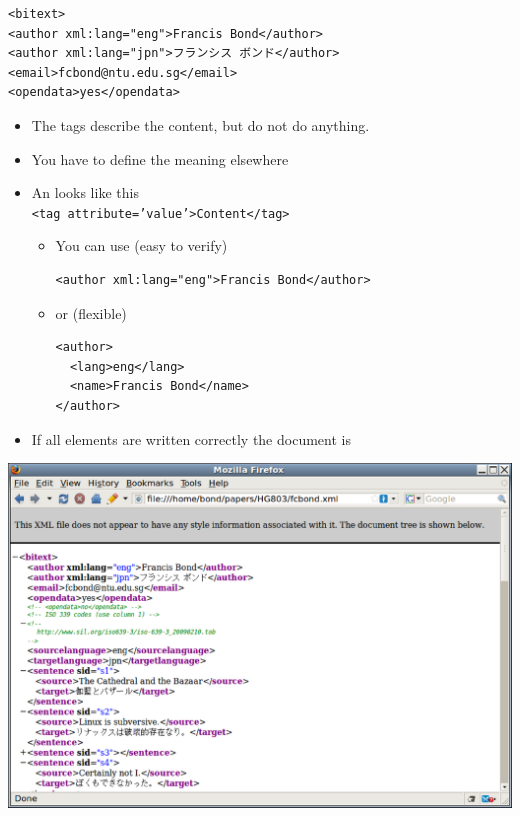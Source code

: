 \documentclass[a4paper,landscape,headrule,footrule,xetex]{foils}
\begin{document}


\begin{verbatim}
<bitext> 
<author xml:lang="eng">Francis Bond</author> 
<author xml:lang="jpn">フランシス ボンド</author>
<email>fcbond@ntu.edu.sg</email> 
<opendata>yes</opendata>
\end{verbatim}

\begin{itemize}
\item The tags describe the content, but do not do anything.
\item You have to define the meaning elsewhere
\end{itemize}


\begin{itemize}
\item An  looks like this
\\ \texttt{<tag attribute='value'>Content</tag>}
  \begin{itemize}
\item You can use  (easy to verify)
\begin{verbatim}
<author xml:lang="eng">Francis Bond</author>
\end{verbatim}
  \item or  (flexible)
\begin{verbatim}
<author>
  <lang>eng</lang>
  <name>Francis Bond</name>
</author>
\end{verbatim}
  \end{itemize}
\item If all elements are written correctly the document is 
\end{itemize}



\includegraphics[height=\textheight]{../pics/xml-sample.eps}
\end{document}
